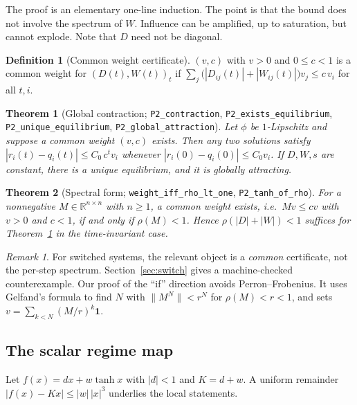 \documentclass[11pt]{article}
\newtheorem{theorem}{Theorem}
\theoremstyle{definition}
\newtheorem{definition}{Definition}
\theoremstyle{remark}
\newtheorem{remark}{Remark}
\newcommand{\lean}[1]{\texttt{\small #1}}
\newcommand{\R}{\mathbb{R}}
\begin{document}
The proof is an elementary one-line induction. The point is that the bound does not involve the
spectrum of $W$. Influence can be amplified, up to saturation, but
cannot explode. Note that $D$ need not be diagonal.

\begin{definition}[Common weight certificate]
$(v,c)$ with $v>0$ and $0\le c<1$ is a common weight for $(D(t),W(t))_t$ if
$\sum_j\big(|D_{ij}(t)|+|W_{ij}(t)|\big)v_j\le c\,v_i$ for all $t,i$.
\end{definition}

\begin{theorem}[Global contraction; \lean{P2\_contraction}, \lean{P2\_exists\_equilibrium},
\lean{P2\_unique\_equilibrium}, \lean{P2\_global\_attraction}]\label{thm:contraction}
Let $\phi$ be $1$-Lipschitz and suppose a common weight $(v,c)$ exists. Then any two solutions satisfy
$|r_i(t)-q_i(t)|\le C_0\,c^t v_i$ whenever $|r_i(0)-q_i(0)|\le C_0 v_i$. If $D,W,s$ are constant, there
is a unique equilibrium, and it is globally attracting.
\end{theorem}

\begin{theorem}[Spectral form; \lean{weight\_iff\_rho\_lt\_one}, \lean{P2\_tanh\_of\_rho}]\label{thm:spectral}
For a nonnegative $M\in\R^{n\times n}$ with $n\ge1$, a common weight exists, i.e.\ $Mv\le cv$ with $v>0$ and
$c<1$, if and only if $\rho(M)<1$. Hence $\rho(|D|+|W|)<1$ suffices for Theorem~\ref{thm:contraction}
in the time-invariant case.
\end{theorem}

\begin{remark}
For switched systems, the relevant object is a \emph{common} certificate, not the per-step spectrum.
Section~\ref{sec:switch} gives a machine-checked counterexample. Our proof of the ``if'' direction
avoids Perron--Frobenius. It uses Gelfand's formula to find $N$ with $\|M^N\|<r^N$ for
$\rho(M)<r<1$, and sets $v=\sum_{k<N}(M/r)^k\mathbf 1$.
\end{remark}

\subsection{The scalar regime map}

Let $f(x)=dx+w\tanh x$ with $|d|<1$ and $K=d+w$. A uniform remainder $|f(x)-Kx|\le|w|\,|x|^3$ underlies
the local statements.
\end{document}
